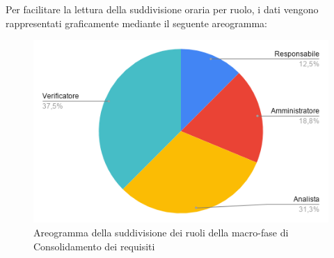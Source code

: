 \documentclass[../piano-di-progetto.tex]{subfiles}
\begin{document}
  Per facilitare la lettura della suddivisione oraria per ruolo, i dati vengono rappresentati graficamente mediante il seguente areogramma:
  \begin{figure}[H]
    \centering
    \includegraphics[width=12cm]{img/ruoli-consolidamento.png}
    \caption{Areogramma della suddivisione dei ruoli della macro-fase di Consolidamento dei requisiti}
    \label{fig:ore-ruolo-consolidamento}
  \end{figure}
\end{document}
